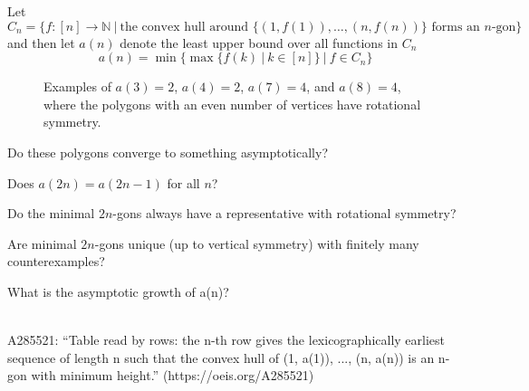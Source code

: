 \documentclass{article}
\begin{document}
Let \[
  C_n = \{f: [n] \rightarrow \mathbb{N}\ |\ \text{the convex hull around } \{(1, f(1)), \hdots, (n, f(n))\} \text{ forms an } n\text{-gon}\}
\] and then let $a(n)$ denote the least upper bound over all functions in $C_n$ \[
  a(n) = \min\{\max\{f(k)\ |\ k \in [n]\}\ |\ f \in C_n\}
\]
\begin{figure}[!h]
  \centering
  \caption{Examples of $a(3) = 2$, $a(4) = 2$, $a(7) = 4$, and $a(8) = 4$, where
    the polygons with an even number of vertices have rotational symmetry.}
\end{figure}

\begin{question}
  Do these polygons converge to something asymptotically?
\end{question}

\begin{related}
  \item Does $a(2n) = a(2n - 1)$ for all $n$?
  \item Do the minimal $2n$-gons always have a representative with rotational
    symmetry?
  \item Are minimal $2n$-gons unique (up to vertical symmetry) with finitely
    many counterexamples?
  \item What is the asymptotic growth of a(n)?
\end{related}

\begin{references} \text{} \\
  A285521: ``Table read by rows: the n-th row gives the lexicographically earliest sequence of length n such that the convex hull of (1, a(1)), ..., (n, a(n)) is an n-gon with minimum height.'' (https://oeis.org/A285521)
\end{references}
\end{document}

